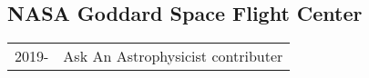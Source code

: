 \documentclass[letterpaper]{article}
\def\footerlink{}
\renewenvironment{itemize}{
  \begin{list}{}{
    \setlength{\leftmargin}{1.5em}
  }
}{
  \end{list}
}
\begin{document}
\subsection*{NASA Goddard Space Flight Center}
\begin{itemize}
\item \begin{tabular}{ll}
2019- & Ask An Astrophysicist contributer
\end{tabular}
\end{itemize}





\bigskip

\end{document}
